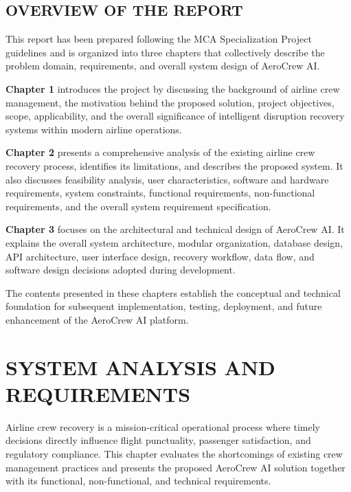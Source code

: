 \documentclass[12pt,a4paper]{report}
\begin{document}
\section{OVERVIEW OF THE REPORT}

This report has been prepared following the MCA Specialization Project guidelines and is organized into three chapters that collectively describe the problem domain, requirements, and overall system design of AeroCrew AI.

\textbf{Chapter 1} introduces the project by discussing the background of airline crew management, the motivation behind the proposed solution, project objectives, scope, applicability, and the overall significance of intelligent disruption recovery systems within modern airline operations.

\textbf{Chapter 2} presents a comprehensive analysis of the existing airline crew recovery process, identifies its limitations, and describes the proposed system. It also discusses feasibility analysis, user characteristics, software and hardware requirements, system constraints, functional requirements, non-functional requirements, and the overall system requirement specification.

\textbf{Chapter 3} focuses on the architectural and technical design of AeroCrew AI. It explains the overall system architecture, modular organization, database design, API architecture, user interface design, recovery workflow, data flow, and software design decisions adopted during development.

The contents presented in these chapters establish the conceptual and technical foundation for subsequent implementation, testing, deployment, and future enhancement of the AeroCrew AI platform.


\chapter{SYSTEM ANALYSIS AND REQUIREMENTS}

Airline crew recovery is a mission-critical operational process where timely decisions directly influence flight punctuality, passenger satisfaction, and regulatory compliance. This chapter evaluates the shortcomings of existing crew management practices and presents the proposed AeroCrew AI solution together with its functional, non-functional, and technical requirements.
\end{document}
